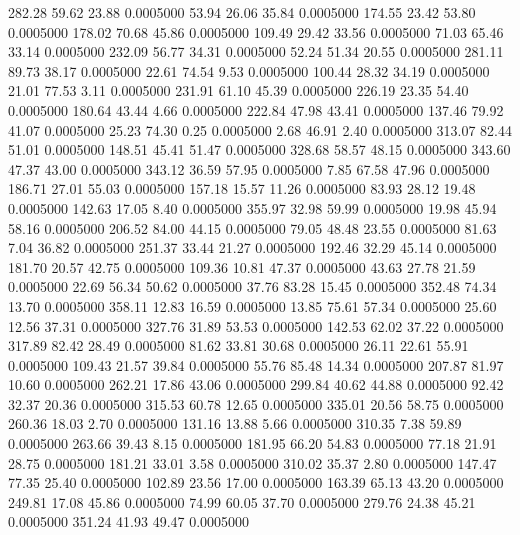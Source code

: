  282.28   59.62   23.88   0.0005000
  53.94   26.06   35.84   0.0005000
 174.55   23.42   53.80   0.0005000
 178.02   70.68   45.86   0.0005000
 109.49   29.42   33.56   0.0005000
  71.03   65.46   33.14   0.0005000
 232.09   56.77   34.31   0.0005000
  52.24   51.34   20.55   0.0005000
 281.11   89.73   38.17   0.0005000
  22.61   74.54    9.53   0.0005000
 100.44   28.32   34.19   0.0005000
  21.01   77.53    3.11   0.0005000
 231.91   61.10   45.39   0.0005000
 226.19   23.35   54.40   0.0005000
 180.64   43.44    4.66   0.0005000
 222.84   47.98   43.41   0.0005000
 137.46   79.92   41.07   0.0005000
  25.23   74.30    0.25   0.0005000
   2.68   46.91    2.40   0.0005000
 313.07   82.44   51.01   0.0005000
 148.51   45.41   51.47   0.0005000
 328.68   58.57   48.15   0.0005000
 343.60   47.37   43.00   0.0005000
 343.12   36.59   57.95   0.0005000
   7.85   67.58   47.96   0.0005000
 186.71   27.01   55.03   0.0005000
 157.18   15.57   11.26   0.0005000
  83.93   28.12   19.48   0.0005000
 142.63   17.05    8.40   0.0005000
 355.97   32.98   59.99   0.0005000
  19.98   45.94   58.16   0.0005000
 206.52   84.00   44.15   0.0005000
  79.05   48.48   23.55   0.0005000
  81.63    7.04   36.82   0.0005000
 251.37   33.44   21.27   0.0005000
 192.46   32.29   45.14   0.0005000
 181.70   20.57   42.75   0.0005000
 109.36   10.81   47.37   0.0005000
  43.63   27.78   21.59   0.0005000
  22.69   56.34   50.62   0.0005000
  37.76   83.28   15.45   0.0005000
 352.48   74.34   13.70   0.0005000
 358.11   12.83   16.59   0.0005000
  13.85   75.61   57.34   0.0005000
  25.60   12.56   37.31   0.0005000
 327.76   31.89   53.53   0.0005000
 142.53   62.02   37.22   0.0005000
 317.89   82.42   28.49   0.0005000
  81.62   33.81   30.68   0.0005000
  26.11   22.61   55.91   0.0005000
 109.43   21.57   39.84   0.0005000
  55.76   85.48   14.34   0.0005000
 207.87   81.97   10.60   0.0005000
 262.21   17.86   43.06   0.0005000
 299.84   40.62   44.88   0.0005000
  92.42   32.37   20.36   0.0005000
 315.53   60.78   12.65   0.0005000
 335.01   20.56   58.75   0.0005000
 260.36   18.03    2.70   0.0005000
 131.16   13.88    5.66   0.0005000
 310.35    7.38   59.89   0.0005000
 263.66   39.43    8.15   0.0005000
 181.95   66.20   54.83   0.0005000
  77.18   21.91   28.75   0.0005000
 181.21   33.01    3.58   0.0005000
 310.02   35.37    2.80   0.0005000
 147.47   77.35   25.40   0.0005000
 102.89   23.56   17.00   0.0005000
 163.39   65.13   43.20   0.0005000
 249.81   17.08   45.86   0.0005000
  74.99   60.05   37.70   0.0005000
 279.76   24.38   45.21   0.0005000
 351.24   41.93   49.47   0.0005000
